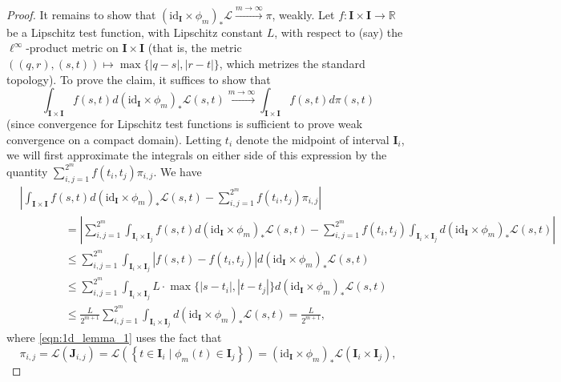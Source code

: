 \documentclass[10pt,a4paper]{amsart}
\newcommand{\R}{\mathbb{R}}
\begin{document}
\begin{proof}
    It remains to show that $(\mathrm{id}_\mathbf{I} \times \phi_m)_\ast \mathscr{L} \xrightarrow{m \to \infty} \pi$, weakly. Let $f:\mathbf{I} \times \mathbf{I} \to \R$ be a Lipschitz test function, with Lipschitz constant $L$, with respect to (say) the $\ell^\infty$-product metric on $\mathbf{I} \times \mathbf{I}$ (that is, the metric $\left((q,r),(s,t)\right) \mapsto \max\{|q-s|,|r-t|\}$, which metrizes the standard topology). To prove the claim, it suffices to show that 
    \[
    \int_{\mathbf{I} \times \mathbf{I}} f(s,t) d(\mathrm{id}_\mathbf{I}\times \phi_m)_\ast \mathscr{L}(s,t) \xrightarrow{m \to \infty} \int_{\mathbf{I} \times \mathbf{I}} f(s,t) d\pi(s,t)
    \]
    (since convergence for Lipschitz test functions is sufficient to prove weak convergence on a compact domain). Letting $t_i$ denote the midpoint of interval $\mathbf{I}_i$, we will first approximate the integrals on either side of this expression by the quantity $\sum_{i,j=1}^{2^m} f(t_i,t_j)\pi_{i,j}$.
    We have 
    \begin{align}
        &\left|\int_{\mathbf{I} \times \mathbf{I}} f(s,t) d(\mathrm{id}_\mathbf{I} \times \phi_m)_\ast \mathscr{L}(s,t) - \sum_{i,j=1}^{2^m} f(t_i,t_j)\pi_{i,j} \right| \nonumber \\
        & \qquad \qquad = \left|\sum_{i,j=1}^{2^m} \int_{\mathbf{I}_i \times \mathbf{I}_j} f(s,t) d(\mathrm{id}_\mathbf{I} \times \phi_m)_\ast \mathscr{L}(s,t) - \sum_{i,j=1}^{2^m}  f(t_i,t_j) \int_{\mathbf{I}_i \times \mathbf{I}_j} d(\mathrm{id}_\mathbf{I} \times \phi_m)_\ast \mathscr{L}(s,t) \right| \label{eqn:1d_lemma_1}\\
        & \qquad \qquad \leq \sum_{i,j=1}^{2^m} \int_{\mathbf{I}_i \times \mathbf{I}_j} |f(s,t) - f(t_i,t_j)| d(\mathrm{id}_\mathbf{I} \times \phi_m)_\ast \mathscr{L}(s,t) \nonumber \\
        &\qquad \qquad \leq  \sum_{i,j=1}^{2^m} \int_{\mathbf{I}_i \times \mathbf{I}_j} L \cdot \max\{|s-t_i|,|t-t_j|\} d(\mathrm{id}_\mathbf{I} \times \phi_m)_\ast \mathscr{L}(s,t) \label{eqn:1d_lemma_2} \\
        &\qquad \qquad \leq \frac{L}{2^{m+1}}\sum_{i,j=1}^{2^m} \int_{\mathbf{I}_i \times \mathbf{I}_j}  d(\mathrm{id}_\mathbf{I} \times \phi_m)_\ast \mathscr{L}(s,t) = \frac{L}{2^{m+1}}, \label{eqn:1d_lemma_3}
    \end{align}
    where \eqref{eqn:1d_lemma_1} uses the fact that
    \begin{equation*}
    \pi_{i,j} = \mathscr{L}(\mathbf{J}_{i,j}) = \mathscr{L}\left(\left\{t \in \mathbf{I}_i \mid \phi_m(t) \in \mathbf{I}_j \right\} \right) = (\mathrm{id}_\mathbf{I}\times \phi_m)_\ast \mathscr{L}(\mathbf{I}_i \times \mathbf{I}_j),

\end{equation*}
\end{proof}
\end{document}
